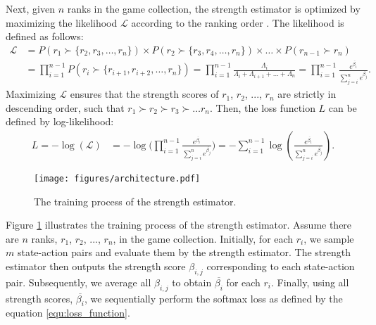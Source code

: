 Next, given $n$ ranks in the game collection, the strength estimator is optimized by maximizing the likelihood $\mathcal{L}$ according to the ranking order \citep{xia_listwise_2008,chen_ranking_2009}.
The likelihood is defined as follows:
\begin{align}
\label{equ:likelihood}
    \mathcal{L} &= P(r_1\succ\{r_2, r_3, \ldots, r_n\}) \times P(r_2\succ\{r_3, r_4, \ldots, r_n\}) \times \ldots \times P(r_{n-1}\succ r_n)\nonumber\\
                &= \prod_{i=1}^{n-1} P(r_i \succ \{r_{i+1}, r_{i+2}, \ldots, r_{n}\})
                = \prod_{i=1}^{n-1} \frac{\Lambda_{i}}{\Lambda_{i} + \Lambda_{i+1} + \ldots + \Lambda_{n}}
                = \prod_{i=1}^{n-1}\frac{e^{\overline{\beta_i}}}{\sum_{j=i}^{n}e^{\overline{\beta_j}}}.
\end{align}
Maximizing $\mathcal{L}$ ensures that the strength scores of $r_1$, $r_2$, ..., $r_n$ are strictly in descending order, such that $r_1 \succ r_2 \succ r_3 \succ \ldots r_n$.
Then, the loss function $L$ can be defined by log-likelihood:
\begin{align}
\label{equ:loss_function}
    L = -\log(\mathcal{L}) &= -\log\biggl(\prod_{i=1}^{n-1}\frac{e^{\overline{\beta_i}}}{\sum_{j=i}^{n}e^{\overline{\beta_j}}}\bigg)
    = -\sum_{i=1}^{n-1}\log(\frac{e^{\overline{\beta_i}}}{\sum_{j=i}^{n}e^{\overline{\beta_j}}}).
\end{align}

\begin{figure}[t]
\centering
\texttt{[image: figures/architecture.pdf]}
\caption{The training process of the strength estimator.}
\label{fig:architecture}
\end{figure}

Figure \ref{fig:architecture} illustrates the training process of the strength estimator.
Assume there are $n$ ranks, $r_1$, $r_2$, ..., $r_n$, in the game collection.
Initially, for each $r_i$, we sample $m$ state-action pairs and evaluate them by the strength estimator.
The strength estimator then outputs the strength score $\beta_{i,j}$ corresponding to each state-action pair.
Subsequently, we average all $\beta_{i,j}$ to obtain $\overline{\beta_i}$ for each $r_i$.
Finally, using all strength scores, $\overline{\beta_i}$, we sequentially perform the softmax loss as defined by the equation \ref{equ:loss_function}.

